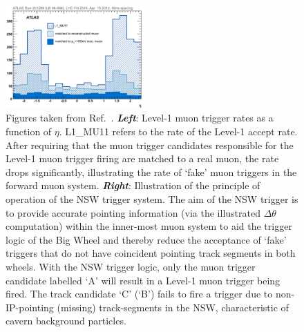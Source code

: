 \begin{figure}[!htb]
    \begin{center}
        \includegraphics[width=0.47\textwidth]{figures/nsw/nsw_l1mu_rates}
        \caption{
            Figures taken from Ref.~\cite{NSWTDR}.
            \textbf{\textit{Left}}: Level-1 muon trigger rates as a function of $\eta$. L1\_MU11 refers to the
                rate of the Level-1 accept rate. After requiring that the muon trigger candidates
                responsible for the Level-1 muon trigger firing are matched to a real muon, the
                rate drops significantly, illustrating the rate of `fake' muon triggers in the
                forward muon system.
            \textbf{\textit{Right}}: Illustration of the principle of operation of the NSW trigger system.
                The aim of the NSW trigger is to provide accurate pointing information (via the illustrated $\Delta \theta$ computation) within
                the inner-most muon system to aid the trigger logic of the Big Wheel and thereby reduce the acceptance of `fake' triggers that
                do not have coincident pointing track segments in both wheels.
                With the NSW trigger logic, only the muon trigger candidate labelled `A' will result
                in a Level-1 muon trigger being fired.
                The track candidate `C' (`B') fails to fire a trigger due to non-IP-pointing (missing) track-segments in the NSW,
                characteristic of cavern background particles.
        }
        \label{fig:l1mu_rates}
    \end{center}
\end{figure}

